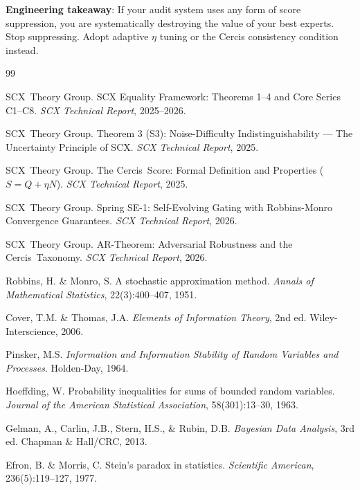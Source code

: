 \documentclass[12pt,a4paper]{article}
\theoremstyle{definition}
\newcommand{\SCX}{\textsf{SCX}}
\newcommand{\Cercis}{\textsf{Cercis}}
\begin{document}
\textbf{Engineering takeaway}: If your audit system uses any form of score suppression, you are systematically destroying the value of your best experts. Stop suppressing. Adopt adaptive $\eta$ tuning or the Cercis consistency condition instead.

\begin{thebibliography}{99}

\SCX\ Theory Group.
\newblock SCX Equality Framework: Theorems 1--4 and Core Series C1--C8.
\newblock \textit{SCX Technical Report}, 2025--2026.

\SCX\ Theory Group.
\newblock Theorem 3 (S3): Noise-Difficulty Indistinguishability --- The Uncertainty Principle of SCX.
\newblock \textit{SCX Technical Report}, 2025.

\SCX\ Theory Group.
\newblock The \Cercis\ Score: Formal Definition and Properties ($S = Q + \eta N$).
\newblock \textit{SCX Technical Report}, 2025.

\SCX\ Theory Group.
\newblock Spring SE-1: Self-Evolving Gating with Robbins-Monro Convergence Guarantees.
\newblock \textit{SCX Technical Report}, 2026.

\SCX\ Theory Group.
\newblock AR-Theorem: Adversarial Robustness and the \Cercis\ Taxonomy.
\newblock \textit{SCX Technical Report}, 2026.

Robbins, H. \& Monro, S.
\newblock A stochastic approximation method.
\newblock \textit{Annals of Mathematical Statistics}, 22(3):400--407, 1951.

Cover, T.M. \& Thomas, J.A.
\newblock \textit{Elements of Information Theory}, 2nd ed.
\newblock Wiley-Interscience, 2006.

Pinsker, M.S.
\newblock \textit{Information and Information Stability of Random Variables and Processes}.
\newblock Holden-Day, 1964.

Hoeffding, W.
\newblock Probability inequalities for sums of bounded random variables.
\newblock \textit{Journal of the American Statistical Association}, 58(301):13--30, 1963.

Gelman, A., Carlin, J.B., Stern, H.S., \& Rubin, D.B.
\newblock \textit{Bayesian Data Analysis}, 3rd ed.
\newblock Chapman \& Hall/CRC, 2013.

Efron, B. \& Morris, C.
\newblock Stein's paradox in statistics.
\newblock \textit{Scientific American}, 236(5):119--127, 1977.


\end{thebibliography}
\end{document}
